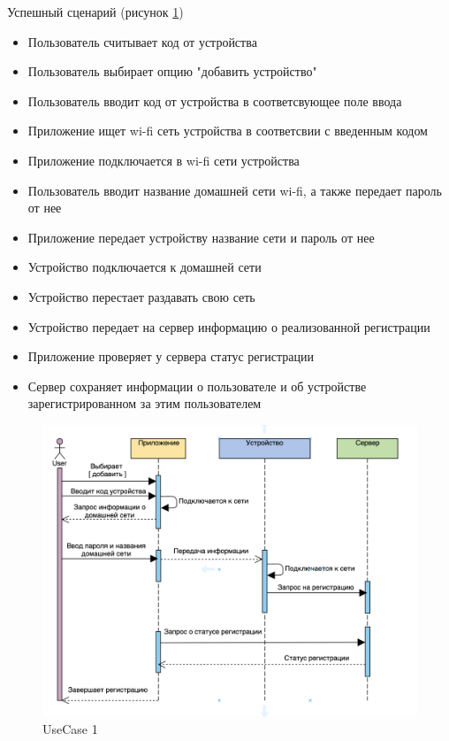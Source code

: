 Успешный сценарий (рисунок \ref{fig:pic_useCase1})
\begin{itemize}
    \item Пользователь считывает код от устройства
    \item Пользователь выбирает опцию "добавить устройство"
    \item Пользователь вводит код от устройства в соответсвующее поле ввода
    \item Приложение ищет wi-fi сеть устройства в соответсвии с введенным кодом
    \item Приложение подключается в wi-fi сети устройства
    \item Пользователь вводит название домашней сети wi-fi, а также передает пароль от нее
    \item Приложение передает устройству название сети и пароль от нее
    \item Устройство подключается к домашней сети
    \item Устройство перестает раздавать свою сеть
    \item Устройство передает на сервер информацию о реализованной регистрации
    \item Приложение проверяет у сервера статус регистрации
    \item Сервер сохраняет информации о пользователе и об устройстве зарегистрированном за этим пользователем
\end{itemize} 


\begin{figure}[ht]
   \centering
   \includegraphics[scale=.5]{figures/pic_useCase1}
    \caption{UseCase 1}
    \label{fig:pic_useCase1}
\end{figure}

